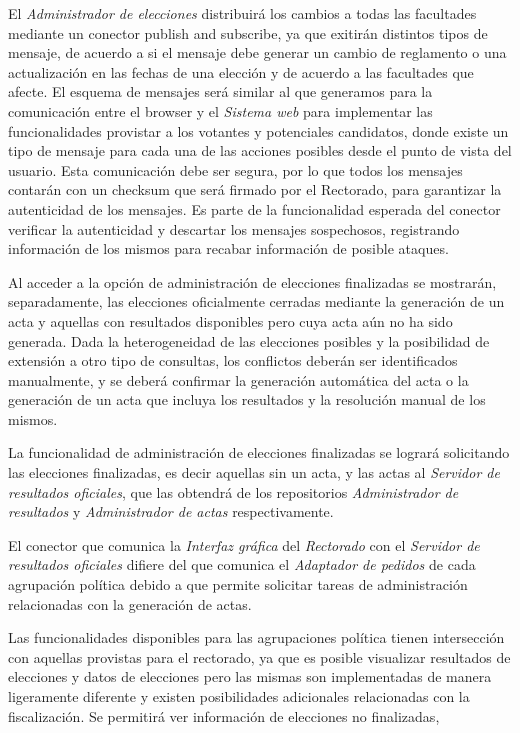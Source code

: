 El \emph{Administrador de elecciones} distribuirá los cambios a todas las facultades mediante un conector publish and subscribe, ya que exitirán distintos tipos de mensaje, de acuerdo a si el mensaje debe generar un cambio de reglamento o una actualización en las fechas de una elección y de acuerdo a las facultades que afecte. El esquema de mensajes será similar al que generamos para la comunicación entre el browser y el \emph{Sistema web} para implementar las funcionalidades provistar a los votantes y potenciales candidatos, donde existe un tipo de mensaje para cada una de las acciones posibles desde el punto de vista del usuario.
Esta comunicación debe ser segura, por lo que todos los mensajes contarán con un checksum que será firmado por el Rectorado, para garantizar la autenticidad de los mensajes. Es parte de la funcionalidad esperada del conector verificar la autenticidad y descartar los mensajes sospechosos, registrando información de los mismos para recabar información de posible ataques. 


Al acceder a la opción de administración de elecciones finalizadas se mostrarán, separadamente, las elecciones oficialmente cerradas mediante la generación de un acta y aquellas con resultados disponibles pero cuya acta aún no ha sido generada. Dada la heterogeneidad de las elecciones posibles y la posibilidad de extensión a otro tipo de consultas, los conflictos deberán ser identificados manualmente, y se deberá confirmar la generación automática del acta o la generación de un acta que incluya los resultados y la resolución manual de los mismos. 

La funcionalidad de administración de elecciones finalizadas se logrará solicitando las elecciones finalizadas, es decir aquellas sin un acta, y las actas al \emph{Servidor de resultados oficiales}, que las obtendrá de los repositorios \emph{Administrador de resultados} y \emph{Administrador de actas} respectivamente.

El conector que comunica la \emph{Interfaz gráfica} del \emph{Rectorado} con el \emph{Servidor de resultados oficiales} difiere del que comunica el \emph{Adaptador de pedidos} de cada agrupación política debido a que permite solicitar tareas de administración relacionadas con la generación de actas.




Las funcionalidades disponibles para las agrupaciones política tienen intersección con aquellas provistas para el rectorado, ya que es posible visualizar resultados de elecciones y datos de elecciones pero las mismas son implementadas de manera ligeramente diferente y existen posibilidades adicionales relacionadas con la fiscalización. Se permitirá ver información de elecciones no finalizadas,  



